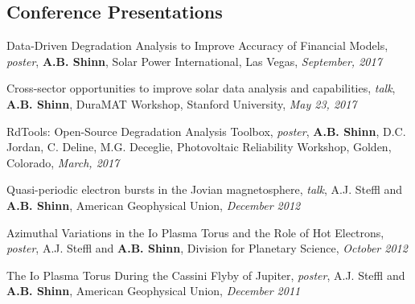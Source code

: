 \documentclass[margin,line]{res}
\newenvironment{list2}{
  \begin{list}{$\cdot$}{%
      \setlength{\itemsep}{0in}
      \setlength{\parsep}{0in} \setlength{\parskip}{0in}
      \setlength{\topsep}{0in} \setlength{\partopsep}{0in} 
      \setlength{\leftmargin}{0.2in}}}{\end{list}}
\begin{document}
\begin{resume}
% 
% 
% 


\section{\sc Conference Presentations}

Data-Driven Degradation Analysis to Improve Accuracy of Financial Models, {\it poster}, {\bf A.B. Shinn}, Solar Power International, Las Vegas, {\it September, 2017}

Cross-sector opportunities to improve solar data analysis and capabilities, {\it talk}, {\bf A.B. Shinn}, DuraMAT Workshop, Stanford University, {\it May 23, 2017}

RdTools: Open-Source Degradation Analysis Toolbox, {\it poster}, {\bf A.B. Shinn}, D.C. Jordan, C. Deline, M.G. Deceglie, Photovoltaic Reliability Workshop, Golden, Colorado, {\it March, 2017}

Quasi-periodic electron bursts in the Jovian magnetosphere, {\it talk}, A.J. Steffl and {\bf A.B. Shinn}, American Geophysical Union, {\it December 2012}

Azimuthal Variations in the Io Plasma Torus and the Role of Hot Electrons, {\it poster}, A.J. Steffl and {\bf A.B. Shinn}, Division for Planetary Science, {\it October 2012}

The Io Plasma Torus During the Cassini Flyby of Jupiter, {\it poster}, A.J. Steffl and {\bf A.B. Shinn}, American Geophysical Union, {\it December 2011}


\end{resume}
\end{document}
